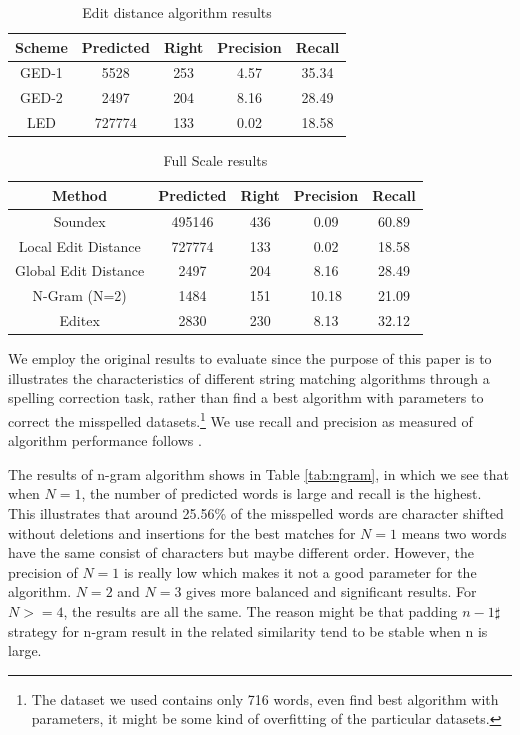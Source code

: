 \documentclass[11pt]{article}
\begin{document}
\begin{table}
	\small
	\centering
	\begin{tabular}{c|c|c|c|c}
		\hline
		Scheme &Predicted & Right & Precision & Recall \\
		\hline
		GED-1 & 5528 & 253 & 4.57 & 35.34 \\
		\hline
		GED-2 & 2497 & 204 & 8.16 & 28.49 \\
		\hline
		LED & 727774 & 133 & 0.02 & 18.58 \\
		\hline
	\end{tabular}
	\caption{Edit distance algorithm results}
	\label{tab:editdis}
\end{table}

\begin{table}
	\centering
	\small
	\begin{tabular}{c|c|c|c|c}
		\hline
		Method &Predicted & Right & Precision & Recall \\
		\hline
		Soundex & 495146 & 436 & 0.09 & 60.89 \\
		\hline
		Local Edit Distance  & 727774 & 133 & 0.02 & 18.58 \\
		\hline
		Global Edit Distance  & 2497 & 204 & 8.16 & 28.49 \\
		\hline
		N-Gram (N=2) & 1484 & 151 & 10.18 & 21.09 \\
		\hline
		Editex & 2830 & 230 & 8.13 & 32.12 \\
		\hline
	\end{tabular}
	\caption{Full Scale results}
	\label{tab:result}
\end{table}

We employ the original results to evaluate since the purpose of this paper is to illustrates the characteristics of different string matching algorithms through a spelling correction task, rather than find a best algorithm with parameters to correct the misspelled datasets.\footnote{The dataset we used contains only 716 words, even find best algorithm with parameters, it might be some kind of overfitting of the particular datasets.} We use recall and precision as measured of algorithm performance follows \cite{Raghavan1989}.

The results of n-gram algorithm shows in Table \ref{tab:ngram}, in which we see that when $N=1$, the number of predicted words is large and recall is the highest. This illustrates that around 25.56\% of the misspelled words are character shifted without deletions and insertions for the best matches for $N=1$ means two words have the same consist of characters but maybe different order. However, the precision of $N=1$ is really low which makes it not a good parameter for the algorithm. $N=2$ and $N=3$ gives more balanced and significant results. For $N>=4$, the results are all the same. The reason might be that padding $n-1 \sharp$ strategy for n-gram result in the related similarity tend to be stable when n is large. 
\end{document}
